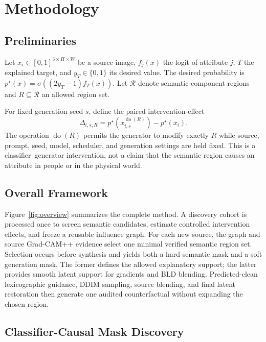 \documentclass[10pt,twocolumn]{article}
\newcommand{\bld}{\textsc{BLD}}
\begin{document}
\section{Methodology}

\subsection{Preliminaries}
\label{sec:preliminaries}

Let $x_i\in[0,1]^{3\times H\times W}$ be a source image, $f_j(x)$ the logit of
attribute $j$, $T$ the explained target, and $y_T\in\{0,1\}$ its desired value.
The desired probability is
$p^\star(x)=\sigma((2y_T-1)f_T(x))$. Let $\mathcal R$ denote semantic component
regions and $R\subseteq\mathcal R$ an allowed region set.

For fixed generation seed $s$, define the paired intervention effect
\begin{equation}
 \Delta_{i,s,R}
 =p^\star\!\left(x_{i,s}^{\operatorname{do}(R)}\right)-p^\star(x_i).
 \label{eq:intervention-effect}
\end{equation}
The operation $\operatorname{do}(R)$ permits the generator to modify exactly
$R$ while source, prompt, seed, model, scheduler, and generation settings are
held fixed. This is a classifier--generator intervention, not a claim that the
semantic region causes an attribute in people or in the physical world.

\subsection{Overall Framework}
\label{sec:framework}

Figure~\ref{fig:overview} summarizes the complete method. A discovery cohort
is processed once to screen semantic candidates, estimate controlled
intervention effects, and freeze a reusable influence graph. For each new
source, the graph and source Grad-CAM++ evidence select one minimal verified
semantic region set. Selection occurs before synthesis and yields both a hard
semantic mask and a soft generation mask. The former defines the allowed
explanatory support; the latter provides smooth latent support for gradients
and \bld{} blending. Predicted-clean lexicographic guidance, DDIM sampling,
source blending, and final latent restoration then generate one audited
counterfactual without expanding the chosen region.

\subsection{Classifier-Causal Mask Discovery}
\label{sec:discovery}
\end{document}
